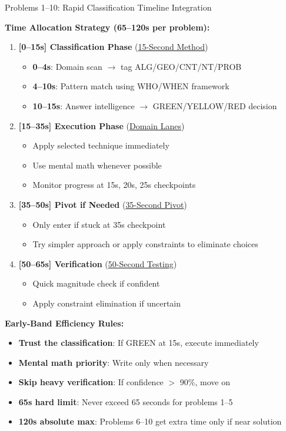 \documentclass{article}
\begin{document}
\begin{timebox}{Problems 1--10: Rapid Classification Timeline Integration}

\textbf{Time Allocation Strategy (65--120s per problem):}
\begin{enumerate}
\item \textbf{[0--15s] Classification Phase} (\hyperlink{classify-15}{15-Second Method})
   \begin{itemize}
   \item \textbf{0--4s}: Domain scan $\rightarrow$ tag ALG/GEO/CNT/NT/PROB
   \item \textbf{4--10s}: Pattern match using WHO/WHEN framework
   \item \textbf{10--15s}: Answer intelligence $\rightarrow$ GREEN/YELLOW/RED decision
   \end{itemize}
\item \textbf{[15--35s] Execution Phase} (\hyperlink{domain-lanes}{Domain Lanes})
   \begin{itemize}
   \item Apply selected technique immediately
   \item Use mental math whenever possible
   \item Monitor progress at 15s, 20s, 25s checkpoints
   \end{itemize}
\item \textbf{[35--50s] Pivot if Needed} (\hyperlink{pivot35}{35-Second Pivot})
   \begin{itemize}
   \item Only enter if stuck at 35s checkpoint
   \item Try simpler approach or apply constraints to eliminate choices
   \end{itemize}
\item \textbf{[50--65s] Verification} (\hyperlink{answer-test-50}{50-Second Testing})
   \begin{itemize}
   \item Quick magnitude check if confident
   \item Apply constraint elimination if uncertain
   \end{itemize}
\end{enumerate}

\textbf{Early-Band Efficiency Rules:}
\begin{itemize}[nosep]
\item \textbf{Trust the classification}: If GREEN at 15s, execute immediately
\item \textbf{Mental math priority}: Write only when necessary
\item \textbf{Skip heavy verification}: If confidence $>$ 90\%, move on
\item \textbf{65s hard limit}: Never exceed 65 seconds for problems 1--5
\item \textbf{120s absolute max}: Problems 6--10 get extra time only if near solution
\end{itemize}


\end{timebox}
\end{document}
